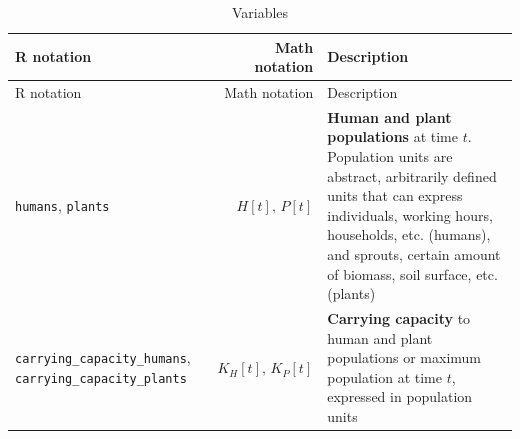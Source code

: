 \documentclass[
]{book}
\begin{document}
\begin{longtable}[]{@{}lrl@{}}
\caption{Variables}\tabularnewline
\toprule
\begin{minipage}[b]{0.36\columnwidth}\raggedright
R notation\strut
\end{minipage} & \begin{minipage}[b]{0.22\columnwidth}\raggedleft
Math notation\strut
\end{minipage} & \begin{minipage}[b]{0.34\columnwidth}\raggedright
Description\strut
\end{minipage}\tabularnewline
\midrule
\endfirsthead
\toprule
\begin{minipage}[b]{0.36\columnwidth}\raggedright
R notation\strut
\end{minipage} & \begin{minipage}[b]{0.22\columnwidth}\raggedleft
Math notation\strut
\end{minipage} & \begin{minipage}[b]{0.34\columnwidth}\raggedright
Description\strut
\end{minipage}\tabularnewline
\midrule
\endhead
\begin{minipage}[t]{0.36\columnwidth}\raggedright
\texttt{humans}, \texttt{plants}\strut
\end{minipage} & \begin{minipage}[t]{0.22\columnwidth}\raggedleft
\(H[t],\,P[t]\)\strut
\end{minipage} & \begin{minipage}[t]{0.34\columnwidth}\raggedright
\textbf{Human and plant populations} at time \(t\). Population units are abstract, arbitrarily defined units that can express individuals, working hours, households, etc. (humans), and sprouts, certain amount of biomass, soil surface, etc. (plants)\strut
\end{minipage}\tabularnewline
\begin{minipage}[t]{0.36\columnwidth}\raggedright
\texttt{carrying\_capacity\_humans}, \texttt{carrying\_capacity\_plants}\strut
\end{minipage} & \begin{minipage}[t]{0.22\columnwidth}\raggedleft
\(K_{H}[t],\,K_{P}[t]\)\strut
\end{minipage} & \begin{minipage}[t]{0.34\columnwidth}\raggedright
\textbf{Carrying capacity} to human and plant populations or maximum population at time \(t\), expressed in population units\strut
\end{minipage}\tabularnewline

\end{longtable}
\end{document}

